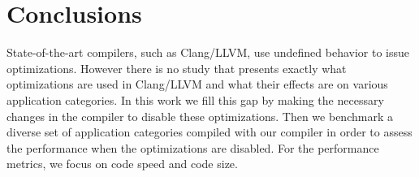 \section{Conclusions} \label{sec:ccl}

State-of-the-art compilers, such as Clang/LLVM, use undefined behavior
to issue optimizations. However there is no study that presents exactly
what optimizations are used in Clang/LLVM and what their effects are on
various application categories. In this work we fill this gap by making
the necessary changes in the compiler to disable these optimizations.
Then we benchmark a diverse set of application categories compiled with
our compiler in order to assess the performance when the optimizations
are disabled. For the performance metrics, we focus on code speed and
code size.
